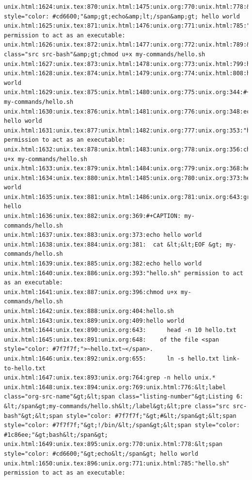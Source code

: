 \documentclass[11pt]{article}
\begin{document}
\begin{verbatim}
unix.html:1624:unix.tex:870:unix.html:1475:unix.org:770:unix.html:778:&amp;lt;span style="color: #cd6600;"&amp;gt;echo&amp;lt;/span&amp;gt; hello world
unix.html:1625:unix.tex:871:unix.html:1476:unix.org:771:unix.html:785:"hello.sh" permission to act as an executable:
unix.html:1626:unix.tex:872:unix.html:1477:unix.org:772:unix.html:789:&amp;lt;pre class="src src-bash"&amp;gt;chmod u+x my-commands/hello.sh
unix.html:1627:unix.tex:873:unix.html:1478:unix.org:773:unix.html:799:hello.sh
unix.html:1628:unix.tex:874:unix.html:1479:unix.org:774:unix.html:808:hello world
unix.html:1629:unix.tex:875:unix.html:1480:unix.org:775:unix.org:344:#+CAPTION: my-commands/hello.sh
unix.html:1630:unix.tex:876:unix.html:1481:unix.org:776:unix.org:348:echo hello world
unix.html:1631:unix.tex:877:unix.html:1482:unix.org:777:unix.org:353:"hello.sh" permission to act as an executable:
unix.html:1632:unix.tex:878:unix.html:1483:unix.org:778:unix.org:356:chmod u+x my-commands/hello.sh
unix.html:1633:unix.tex:879:unix.html:1484:unix.org:779:unix.org:368:hello.sh
unix.html:1634:unix.tex:880:unix.html:1485:unix.org:780:unix.org:373:hello world
unix.html:1635:unix.tex:881:unix.html:1486:unix.org:781:unix.org:643:grep hello 
unix.html:1636:unix.tex:882:unix.org:369:#+CAPTION: my-commands/hello.sh
unix.html:1637:unix.tex:883:unix.org:373:echo hello world
unix.html:1638:unix.tex:884:unix.org:381:  cat &lt;&lt;EOF &gt; my-commands/hello.sh
unix.html:1639:unix.tex:885:unix.org:382:echo hello world
unix.html:1640:unix.tex:886:unix.org:393:"hello.sh" permission to act as an executable:
unix.html:1641:unix.tex:887:unix.org:396:chmod u+x my-commands/hello.sh
unix.html:1642:unix.tex:888:unix.org:404:hello.sh
unix.html:1643:unix.tex:889:unix.org:409:hello world
unix.html:1644:unix.tex:890:unix.org:643:      head -n 10 hello.txt
unix.html:1645:unix.tex:891:unix.org:648:    of the file <span style="color: #7f7f7f;">~hello.txt~</span>.
unix.html:1646:unix.tex:892:unix.org:655:      ln -s hello.txt link-to-hello.txt
unix.html:1647:unix.tex:893:unix.org:764:grep -n hello unix.*
unix.html:1648:unix.tex:894:unix.org:769:unix.html:776:&lt;label class="org-src-name"&gt;&lt;span class="listing-number"&gt;Listing 6: &lt;/span&gt;my-commands/hello.sh&lt;/label&gt;&lt;pre class="src src-bash"&gt;&lt;span style="color: #7f7f7f;"&gt;#&lt;/span&gt;&lt;span style="color: #7f7f7f;"&gt;!/bin/&lt;/span&gt;&lt;span style="color: #1c86ee;"&gt;bash&lt;/span&gt;
unix.html:1649:unix.tex:895:unix.org:770:unix.html:778:&lt;span style="color: #cd6600;"&gt;echo&lt;/span&gt; hello world
unix.html:1650:unix.tex:896:unix.org:771:unix.html:785:"hello.sh" permission to act as an executable:

\end{verbatim}
\end{document}
